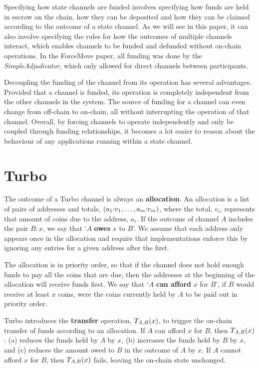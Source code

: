 \documentclass{article}
\begin{document}
Specifying how state channels are funded involves specifying how funds are held in escrow on the chain, how they can be deposited and how they can be claimed according to the outcome of a state channel.
As we will see in this paper, it can also involve specifying the rules for how the outcomes of multiple channels interact, which enables channels to be funded and defunded without on-chain operations.
In the ForceMove paper, all funding was done by the \textit{SimpleAdjudicator}, which only allowed for direct channels between participants.

Decoupling the funding of the channel from its operation has several advantages.
Provided that a channel is funded, its operation is completely independent from the other channels in the system.
The source of funding for a channel can even change from off-chain to on-chain, all without interrupting the operation of that channel.
Overall, by forcing channels to operate independently and only be coupled through funding relationships, it becomes a lot easier to reason about the behaviour of any applications running within a state channel.

\section{Turbo}

The outcome of a Turbo channel is always an \textbf{allocation}.
An allocation is a list of pairs of addresses and totals, $( a_1{:}v_1, \dots, a_m{:}v_m )$, where the total, $v_i$, represents that amount of coins due to the address, $a_i$.
If the outcome of channel $A$ includes the pair $B{:}x$, we say that `$A$ \textbf{owes} $x$ to $B$'.
We assume that each address only appears once in the allocation and require that implementations enforce this by ignoring any entries for a given address after the first.

The allocation is in priority order, so that if the channel does not hold enough funds to pay all the coins that are due, then the addresses at the beginning of the allocation will receive funds first.
We say that `$A$ \textbf{can afford} $x$ for $B$', if $B$ would receive at least $x$ coins, were the coins currently held by $A$ to be paid out in priority order.

Turbo introduces the \textbf{transfer} operation, $T_{A, B}(x)$, to trigger the on-chain transfer of funds according to an allocation.
If $A$ can afford $x$ for $B$, then $T_{A, B}(x)$: (a) reduces the funds held by $A$ by $x$, (b) increases the funds held by $B$ by $x$, and (c) reduces the amount owed to $B$ in the outcome of $A$ by $x$.
If $A$ cannot afford $x$ for $B$, then $T_{A, B}(x)$ fails, leaving the on-chain state unchanged.
\end{document}
